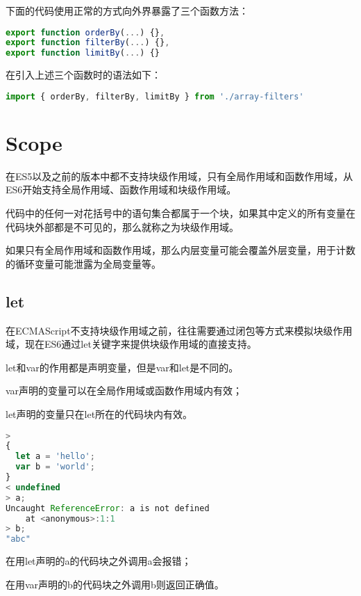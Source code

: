 下面的代码使用正常的方式向外界暴露了三个函数方法：

\begin{lstlisting}[language=JavaScript]
export function orderBy(...) {},
export function filterBy(...) {},
export function limitBy(...) {}
\end{lstlisting}

在引入上述三个函数时的语法如下：



\begin{lstlisting}[language=JavaScript]
import { orderBy, filterBy, limitBy } from './array-filters'
\end{lstlisting}



\chapter{Scope}

在ES5以及之前的版本中都不支持块级作用域，只有全局作用域和函数作用域，从ES6开始支持全局作用域、函数作用域和块级作用域。

代码中的任何一对花括号中的语句集合都属于一个块，如果其中定义的所有变量在代码块外部都是不可见的，那么就称之为块级作用域。

如果只有全局作用域和函数作用域，那么内层变量可能会覆盖外层变量，用于计数的循环变量可能泄露为全局变量等。


\section{let}


在ECMAScript不支持块级作用域之前，往往需要通过闭包等方式来模拟块级作用域，现在ES6通过let关键字来提供块级作用域的直接支持。


let和var的作用都是声明变量，但是var和let是不同的。

\begin{compactitem}
\item var声明的变量可以在全局作用域或函数作用域内有效；
\item let声明的变量只在let所在的代码块内有效。
\end{compactitem}


\begin{lstlisting}[language=JavaScript]
> 
{
  let a = 'hello';  
  var b = 'world';
}
< undefined
> a;
Uncaught ReferenceError: a is not defined
    at <anonymous>:1:1
> b;
"abc"
\end{lstlisting}

\begin{compactitem}
\item 在用let声明的a的代码块之外调用a会报错；
\item 在用var声明的b的代码块之外调用b则返回正确值。
\end{compactitem}

